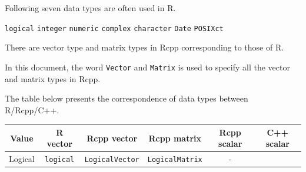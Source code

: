\documentclass[
]{book}
\begin{document}
Following seven data types are often used in R.

\texttt{logical} \texttt{integer} \texttt{numeric} \texttt{complex} \texttt{character} \texttt{Date} \texttt{POSIXct}

There are vector type and matrix types in Rcpp corresponding to those of R.

In this document, the word \texttt{Vector} and \texttt{Matrix} is used to specify all the vector and matrix types in Rcpp.

The table below presents the correspondence of data types between R/Rcpp/C++.

\begin{longtable}[]{@{}cccccc@{}}
\toprule
\begin{minipage}[b]{0.14\columnwidth}\centering
Value\strut
\end{minipage} & \begin{minipage}[b]{0.14\columnwidth}\centering
R vector\strut
\end{minipage} & \begin{minipage}[b]{0.14\columnwidth}\centering
Rcpp vector\strut
\end{minipage} & \begin{minipage}[b]{0.14\columnwidth}\centering
Rcpp matrix\strut
\end{minipage} & \begin{minipage}[b]{0.14\columnwidth}\centering
Rcpp scalar\strut
\end{minipage} & \begin{minipage}[b]{0.14\columnwidth}\centering
C++ scalar\strut
\end{minipage}\tabularnewline
\midrule
\endhead
\begin{minipage}[t]{0.14\columnwidth}\centering
Logical\strut
\end{minipage} & \begin{minipage}[t]{0.14\columnwidth}\centering
\texttt{logical}\strut
\end{minipage} & \begin{minipage}[t]{0.14\columnwidth}\centering
\texttt{LogicalVector}\strut
\end{minipage} & \begin{minipage}[t]{0.14\columnwidth}\centering
\texttt{LogicalMatrix}\strut
\end{minipage} & \begin{minipage}[t]{0.14\columnwidth}\centering
-\strut
\end{minipage} & \begin{minipage}[t]{0.14\columnwidth}\centering

\end{minipage}
\end{longtable}
\end{document}
